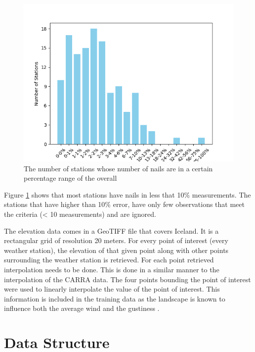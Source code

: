 \begin{figure}
    \includegraphics[scale=0.75]{Figures/error_count.png}
    \caption{The number of stations whose number of nails are in a certain percentage range of the overall}
    \label{fig:error_count}
\end{figure}

Figure \ref{fig:error_count} shows that most stations have nails in less that 10\% measurements. The stations that have higher than 10\% error, have only few observations that meet the criteria (< 10 measurements) and are ignored.

The elevation data comes in a GeoTIFF file that covers Iceland. It is a rectangular grid of resolution 20 meters. For every point of interest (every weather station), the elevation of that given point along with other points surrounding the weather station is retrieved. For each point retrieved interpolation needs to be done. This is done in a similar manner to the interpolation of the CARRA data. The four points bounding the point of interest were used to linearly interpolate the value of the point of interest. This information is included in the training data as the landscape is known to influence both the average wind and the gustiness \cite{GNP_vidtal}. 


\section{Data Structure}

